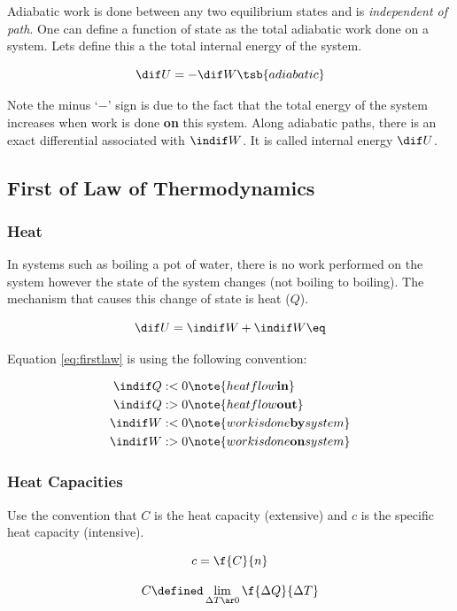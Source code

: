 \documentclass{article}
\begin{document}
Adiabatic work is done between any two equilibrium states and is \textit{independent of path}. One can define a function of state as the total adiabatic work done on a system. Lets define this a the total internal energy of the system.

\[ \dif U = - \dif W\tsb{adiabatic}\]

Note the minus `$-$' sign is due to the fact that the total energy of the system increases when work is done \textbf{on} this system. Along adiabatic paths, there is an exact differential associated with $\indif W$. It is called internal energy $\dif U$.

\subsection{First of Law of Thermodynamics}

\subsubsection{Heat}

In systems such as boiling a pot of water, there is no work performed on the system however the state of the system changes (not boiling to boiling). The mechanism that causes this change of state is heat ($Q$).

\[ \dif U = \indif W + \indif W \eq \label{eq:firstlaw} \]

Equation \eqref{eq:firstlaw} is using the following convention:

\begin{align*}
        \indif Q &:< 0 \note{heat flow \textbf{in}} \\
        \indif Q &:> 0 \note{heat flow \textbf{out}} \\
        \indif W &:< 0 \note{work is done \textbf{by} system} \\
        \indif W &:> 0 \note{work is done \textbf{on} system} \\
\end{align*}

\subsubsection{Heat Capacities}

Use the convention that $C$ is the heat capacity (extensive) and $c$ is the specific heat capacity (intensive).

\[ c = \f{C}{n} \]

\[ C \defined \lim_{\Delta T \ar 0} \f{\Delta Q}{\Delta T} \]
\end{document}
